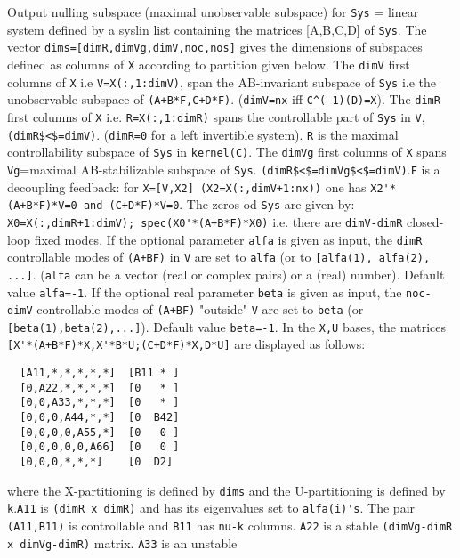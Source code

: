 \begin{mandescription}
  Output nulling subspace (maximal unobservable subspace) for
  \verb!Sys! = linear system defined by a syslin list containing
  the matrices [A,B,C,D] of \verb!Sys!.
  The vector \verb!dims=[dimR,dimVg,dimV,noc,nos]! gives the dimensions
  of subspaces defined as columns of \verb!X! according to partition given
  below.
  The \verb!dimV! first columns of \verb!X! i.e \verb!V=X(:,1:dimV)!, 
  span the AB-invariant subspace of \verb!Sys! i.e the unobservable subspace of 
  \verb!(A+B*F,C+D*F)!. (\verb!dimV=nx!  iff \verb!C^(-1)(D)=X!).
  The \verb!dimR! first columns of \verb!X! i.e. \verb!R=X(:,1:dimR)! spans  
  the controllable part of \verb!Sys! in \verb!V!, \verb!(dimR$<$=dimV)!. (\verb!dimR=0!
  for a left invertible system). \verb!R! is the maximal controllability
  subspace of \verb!Sys! in \verb!kernel(C)!.
  The \verb!dimVg! first columns of \verb!X! spans 
  \verb!Vg!=maximal AB-stabilizable subspace of \verb!Sys!. \verb!(dimR$<$=dimVg$<$=dimV)!.\verb!F! is a decoupling feedback: for \verb!X=[V,X2] (X2=X(:,dimV+1:nx))! one has 
  \verb!X2'*(A+B*F)*V=0 and (C+D*F)*V=0!.
  The zeros od \verb!Sys! are given by: \verb!X0=X(:,dimR+1:dimV); spec(X0'*(A+B*F)*X0)!
  i.e. there are \verb!dimV-dimR! closed-loop fixed modes.
  If the optional parameter \verb!alfa! is given as input, 
  the \verb!dimR! controllable modes of \verb!(A+BF)! in \verb!V! 
  are set to \verb!alfa! (or to \verb![alfa(1), alfa(2), ...]!.
  (\verb!alfa! can be a vector (real or complex pairs) or a (real) number).
  Default value \verb!alfa=-1!.
  If the optional real parameter \verb!beta! is given as input, 
  the \verb!noc-dimV! controllable modes of \verb!(A+BF)! "outside" \verb!V! 
  are set to \verb!beta! (or \verb![beta(1),beta(2),...]!). Default value \verb!beta=-1!.
  In the \verb!X,U! bases, the matrices 
  \verb![X'*(A+B*F)*X,X'*B*U;(C+D*F)*X,D*U]! 
  are displayed as follows:
\begin{verbatim}
  [A11,*,*,*,*,*]  [B11 * ]
  [0,A22,*,*,*,*]  [0   * ]
  [0,0,A33,*,*,*]  [0   * ]
  [0,0,0,A44,*,*]  [0  B42]
  [0,0,0,0,A55,*]  [0   0 ]
  [0,0,0,0,0,A66]  [0   0 ]
  [0,0,0,*,*,*]    [0  D2]
\end{verbatim}
  where the X-partitioning is defined by \verb!dims! and the U-partitioning is
  defined by \verb!k!.\verb!A11! is \verb!(dimR x dimR)! and has its eigenvalues
  set to \verb!alfa(i)'s!.  The pair \verb!(A11,B11)! is controllable and
  \verb!B11! has \verb!nu-k! columns.  \verb!A22! is a stable
  \verb!(dimVg-dimR x dimVg-dimR)! matrix.  \verb!A33! is an unstable

\end{mandescription}
